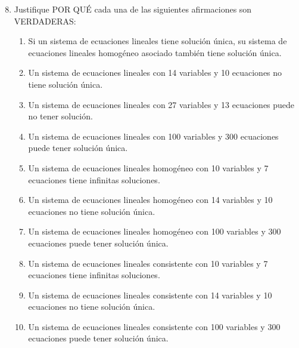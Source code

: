 \documentclass{article}
\begin{document}
\begin{enumerate}
    \setcounter{enumi}{7}
    \item Justifique POR QUÉ cada una de las siguientes afirmaciones son VERDADERAS:
        \begin{enumerate}[label=\listAlph]
			\item Si un sistema de ecuaciones lineales tiene solución única, su sistema de ecuaciones lineales homogéneo asociado también tiene solución única.
			\item Un sistema de ecuaciones lineales con 14 variables y 10 ecuaciones no tiene solución única.
			\item Un sistema de ecuaciones lineales con 27 variables y 13 ecuaciones puede no tener solución.
			\item Un sistema de ecuaciones lineales con 100 variables y 300 ecuaciones puede tener solución única.
			\item Un sistema de ecuaciones lineales homogéneo con 10 variables y 7 ecuaciones tiene infinitas soluciones.
			\item Un sistema de ecuaciones lineales homogéneo con 14 variables y 10 ecuaciones no tiene solución única.
			\item Un sistema de ecuaciones lineales homogéneo con 100 variables y 300 ecuaciones puede tener solución única.
			\item Un sistema de ecuaciones lineales consistente con 10 variables y 7 ecuaciones tiene infinitas soluciones.
			\item Un sistema de ecuaciones lineales consistente con 14 variables y 10 ecuaciones no tiene solución única.
			\item Un sistema de ecuaciones lineales consistente con 100 variables y 300 ecuaciones puede tener solución única.
        \end{enumerate}


\end{enumerate}
\end{document}
